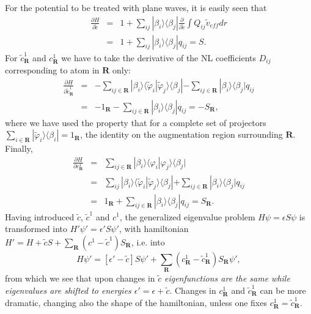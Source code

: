 \documentclass[a4paper,twocolumn,12pt]{article}
\renewcommand{\phi}{\varphi}
\begin{document}
{For the potential to be treated with plane waves, it is easily seen
that
\begin{eqnarray}
\frac{\partial H}{\partial\tilde{c}}&=&1+
\sum_{ij}|\beta_i\rangle\langle\beta_j|
\frac{\partial}{\partial\tilde{c}}\int{Q_{ij}\tilde{v}_{eff}dr}
\nonumber\\&=&1+\sum_{ij}|\beta_i\rangle\langle\beta_j|q_{ij}=S.
\end{eqnarray}
For $\tilde{c}^1_{\mathbf{R}}$ and $c^1_{\mathbf{R}}$ we have to
take the derivative of the NL coefficients $D_{ij}$ corresponding to
atom in ${\mathbf{R}}$ only:
\begin{eqnarray}
\frac{\partial H}{\partial\tilde{c}^1_{\mathbf{R}}}&=&-
\sum_{ij\in{\mathbf{R}}}|\beta_i\rangle\langle\tilde{\phi}_i|\tilde{\phi}_j\rangle\langle\beta_j|
-\sum_{ij\in{\mathbf{R}}}|\beta_i\rangle\langle\beta_j|q_{ij}
\nonumber\\&=&
-1_{\mathbf{R}}-\sum_{ij\in{\mathbf{R}}}|\beta_i\rangle\langle\beta_j|q_{ij}=-S_{\mathbf{R}},
\end{eqnarray}
where we have used the property that for a complete set of projectors
$\sum_{i\in{\mathbf{R}}}|\tilde{\phi}_i\rangle\langle\beta_i|=1_{\mathbf{R}}$,
the identity on the augmentation region surrounding ${\mathbf{R}}$.
Finally,
\begin{eqnarray}
\frac{\partial H}{\partial{c}^1_{\mathbf{R}}}&=&
\sum_{ij\in{\mathbf{R}}}|\beta_i\rangle\langle{\phi}_i|{\phi}_j\rangle\langle\beta_j|
\nonumber\\&=&
\sum_{ij}|\beta_i\rangle\langle\tilde{\phi}_i|\tilde{\phi}_j\rangle\langle\beta_j|+\sum_{ij\in{\mathbf{R}}}|\beta_i\rangle\langle\beta_j|q_{ij}
\nonumber\\&=&
1_{\mathbf{R}}+\sum_{ij\in{\mathbf{R}}}|\beta_i\rangle\langle\beta_j|q_{ij}=S_{\mathbf{R}}.
\end{eqnarray}
Having introduced $\tilde{c}$, $\tilde{c}^1$ and $c^1$, the
generalized eigenvalue problem $H\psi=\epsilon{S}\psi$ is transformed
into $H'\psi'=\epsilon'{S}\psi'$, with hamiltonian
$H'=H+\tilde{c}S+\sum_{\mathbf{R}}(c^1-\tilde{c}^1)S_{\mathbf{R}}$,
i.e. into
\begin{equation}\label{eq:newH}
H\psi'=[\epsilon'-\tilde{c}]S\psi'+\sum_{\mathbf{R}}(c^1_{\mathbf{R}}-\tilde{c}^1_{\mathbf{R}})S_{\mathbf{R}}\psi',
\end{equation}
from which we see that upon changes in $\tilde{c}$ {\em eigenfunctions
are the same while eigenvalues are shifted to energies
$\epsilon'=\epsilon+\tilde{c}$}.  Changes in $c^1_{\mathbf{R}}$ and
$\tilde{c}^1_{\mathbf{R}}$ can be more dramatic, changing also the
shape of the hamiltonian, unless one fixes
$c^1_{\mathbf{R}}=\tilde{c}^1_{\mathbf{R}}$.

}
\end{document}
